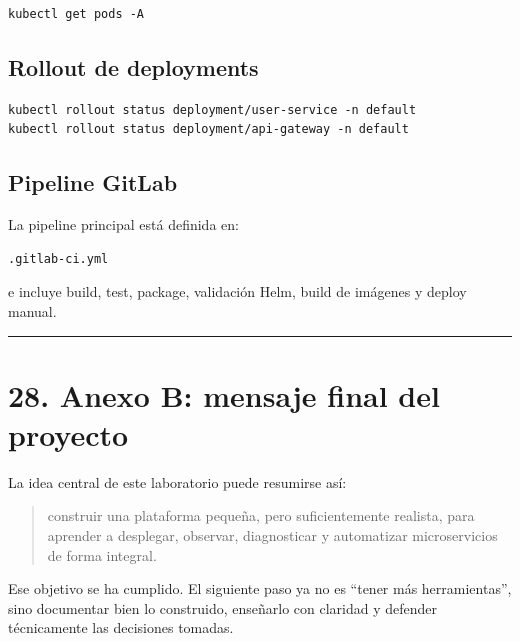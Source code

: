 \documentclass[
a4paper,
12pt]{report}
\begin{document}
\begin{verbatim}
kubectl get pods -A
\end{verbatim}

\section{Rollout de deployments}\label{rollout-de-deployments}

\begin{verbatim}
kubectl rollout status deployment/user-service -n default
kubectl rollout status deployment/api-gateway -n default
\end{verbatim}

\section{Pipeline GitLab}\label{pipeline-gitlab}

La pipeline principal está definida en:

\begin{verbatim}
.gitlab-ci.yml
\end{verbatim}

e incluye build, test, package, validación Helm, build de imágenes y
deploy manual.

\begin{center}\rule{0.5\linewidth}{0.5pt}\end{center}

\chapter{28. Anexo B: mensaje final del
proyecto}\label{anexo-b-mensaje-final-del-proyecto}

La idea central de este laboratorio puede resumirse así:

\begin{quote}
construir una plataforma pequeña, pero suficientemente realista, para
aprender a desplegar, observar, diagnosticar y automatizar
microservicios de forma integral.
\end{quote}

Ese objetivo se ha cumplido. El siguiente paso ya no es ``tener más
herramientas'', sino documentar bien lo construido, enseñarlo con
claridad y defender técnicamente las decisiones tomadas.
\end{document}
